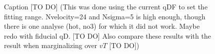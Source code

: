 


\begin{figure}
\caption{Caption [TO DO] (This was done using the current qDF to set the fitting range. Nvelocity=24 and Nsigma=5 is high enough, though there is one analyse (hot, no3) for which it did not work. Maybe redo with fiducial qD. [TO DO] Also compare these results with the result when marginalizing over $vT$ [TO DO])} 
\label{fig:isoSphFlexIncompZ_violins}
\end{figure}


